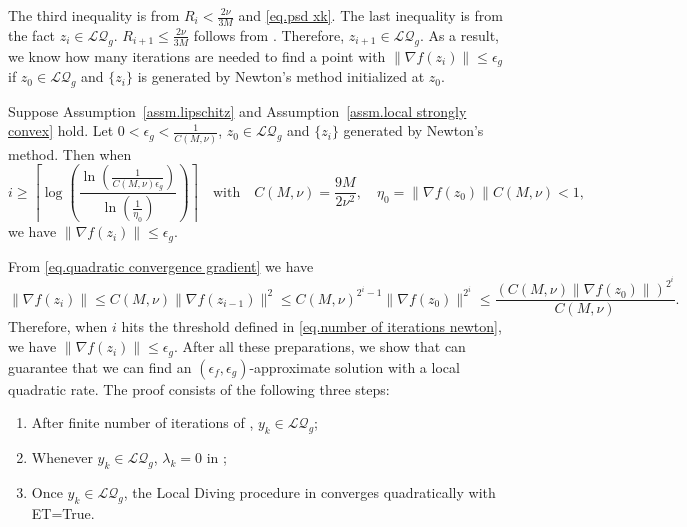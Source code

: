 \documentclass[moor,sglanonrev]{informs4}
\begin{document}
The third inequality is from $R_i< \frac{2\nu}{3M}$ and \eqref{eq.psd xk}. The last inequality is from the fact $z_i\in \mathcal{LQ}_g$. $R_{i+1} \leq \frac{2\nu}{3M}$ follows from . Therefore, $z_{i+1}\in \mathcal{LQ}_g$.
\Halmos \endproof
As a result, we know how many iterations are needed to find a point with $\|\nabla f(z_i)\|\leq \epsilon_g$ if $z_0 \in \mathcal{LQ}_g$ and $\{z_i\}$ is generated by Newton's method initialized at $z_0$.
\begin{corollary}
    \label{lem.number of iterations newton}
    Suppose Assumption~\ref{assm.lipschitz} and Assumption~\ref{assm.local strongly convex} hold. Let $0<\epsilon_g< \frac{1}{C(M,\nu)}$, $z_0\in\mathcal{LQ}_g$ and $\{z_i\}$ generated by Newton's method. Then when
    \begin{equation}
        \label{eq.number of iterations newton}
        i\geq \left\lceil \log\left( \frac{\ln\left(\tfrac{1}{C(M,\nu)\epsilon_g}\right)}{\ln\left(\tfrac{1}{\eta_0}\right)} \right) \right\rceil \quad \text{with} \quad C(M,\nu) = \frac{9M}{2\nu^2}, \quad \eta_0 = \|\nabla f(z_0)\| C(M,\nu)<1,
    \end{equation}
    we have $\|\nabla f(z_i)\|\leq \epsilon_g$.
\end{corollary}
From \eqref{eq.quadratic convergence gradient} we have
\begin{equation*}
    \|\nabla f(z_i)\| \leq C(M,\nu)\|\nabla f(z_{i-1})\|^2 \leq C(M,\nu)^{2^{i}-1} \|\nabla f(z_0)\|^{2^i} \leq \frac{(C(M,\nu)\|\nabla f(z_0)\|)^{2^i}}{C(M,\nu)}.
\end{equation*}
Therefore, when $i$ hits the threshold defined in \eqref{eq.number of iterations newton}, we have $\|\nabla f(z_i)\|\leq \epsilon_g$.
\Halmos \endproof
After all these preparations, we show that  can guarantee that we can find an $(\epsilon_f,\epsilon_g)$-approximate solution with a local quadratic rate. The proof consists of the following three steps:
\begin{enumerate}[label=(\roman*)]
    \item After finite number of iterations of , $y_k\in\mathcal{LQ}_g$;
    \item Whenever $y_k\in\mathcal{LQ}_g$, $\lambda_k=0$ in ;
    \item Once $y_k\in \mathcal{LQ}_g$, the Local Diving procedure in  converges quadratically with ET=True.
\end{enumerate}
\end{document}
